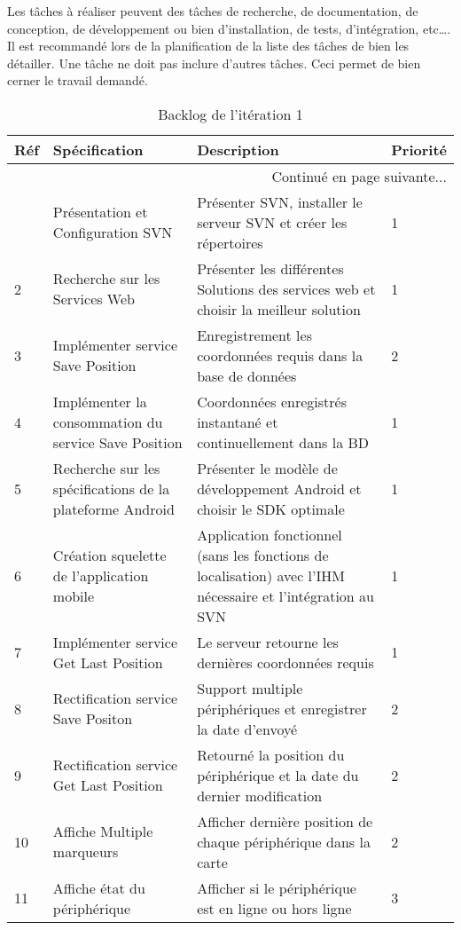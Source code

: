 Les tâches à réaliser peuvent  des tâches de
recherche, de documentation, de conception, de développement ou bien
d'installation, de tests, d'intégration, etc\ldots. Il est recommandé lors de
la planification de la liste des tâches de bien les détailler. Une tâche ne
doit pas inclure d'autres tâches. Ceci permet de bien cerner le travail
demandé.
\begin{center}
    \footnotesize
    \begin{longtable}{| p{1cm} | p{5cm} | p{7cm} | p{1cm} |}
        \caption{Backlog de l'itération 1}
        \label{tab:sprint1-backlog} \\

        \hline
        \textbf{Réf} & \textbf{Spécification} & \textbf{Description} & \textbf{Priorité} \\ \hline
        \endhead

        \hline \multicolumn{4}{|r|}{{Continué en page suivante$\dotsc$}} \\ \hline
        \endfoot

        \hline \hline
        \endlastfoot

        \hline
1 & Présentation et Configuration SVN & Présenter SVN, installer le serveur SVN et créer les répertoires  & 1 \\ \hline
2 & Recherche sur les Services Web & Présenter les différentes Solutions des services web et choisir la meilleur solution & 1 \\ \hline
3 & Implémenter service Save Position & Enregistrement les coordonnées requis dans la base de données & 2 \\ \hline
4 & Implémenter la consommation du service Save Position & Coordonnées enregistrés instantané et continuellement dans la BD & 1 \\ \hline
5 & Recherche sur les spécifications de la plateforme Android & Présenter le modèle de développement Android et choisir le SDK optimale & 1 \\ \hline
6 & Création squelette de l'application mobile & Application fonctionnel (sans les fonctions de localisation) avec l'IHM nécessaire et l'intégration au SVN & 1 \\ \hline
7 & Implémenter service Get Last Position & Le serveur retourne les dernières coordonnées requis & 1 \\ \hline
8 & Rectification service Save Positon & Support multiple périphériques et enregistrer la date d'envoyé & 2 \\ \hline
9 & Rectification service Get Last Position & Retourné la position du périphérique et la date du dernier modification & 2 \\ \hline
10 & Affiche Multiple marqueurs & Afficher dernière position de chaque périphérique dans la carte & 2 \\ \hline
11 & Affiche état du périphérique & Afficher si le périphérique est en ligne ou hors ligne & 3 \\ \hline
    \end{longtable}
\end{center}

